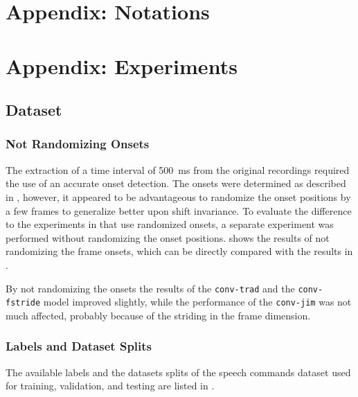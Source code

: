 



\chapter{Appendix: Notations}




\chapter{Appendix: Experiments}

\section{Dataset}

\subsection{Not Randomizing Onsets}
The extraction of a time interval of \SI{500}{\milli\second} from the original recordings required the use of an accurate onset detection.
The onsets were determined as described in , however, it appeared to be advantageous to randomize the onset positions by a few frames to generalize better upon shift invariance.
To evaluate the difference to the experiments in  that use randomized onsets, a separate experiment was performed without randomizing the onset positions.
 shows the results of not randomizing the frame onsets, which can be directly compared with the results in .

By not randomizing the onsets the results of the \texttt{conv-trad} and the \texttt{conv-fstride} model improved slightly, while the performance of the \texttt{conv-jim} was not much affected, probably because of the striding in the frame dimension.

\subsection{Labels and Dataset Splits}
The available labels and the datasets splits of the speech commands dataset \cite{Warden2018} used for training, validation, and testing are listed in .




